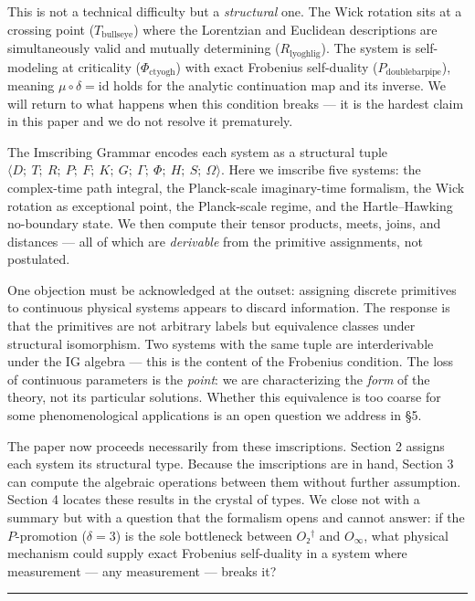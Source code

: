 \documentclass[12pt,a4paper]{article}
\newcommand{\pilcrow}{\S}
\begin{document}
This is not a technical difficulty but a \emph{structural} one. The Wick rotation sits at a crossing point ($T_{\text{bullseye}}$) where the Lorentzian and Euclidean descriptions are simultaneously valid and mutually determining ($R_{\text{lyoghlig}}$). The system is self-modeling at criticality ($\Phi_{\text{ctyogh}}$) with exact Frobenius self-duality ($P_{\text{doublebarpipe}}$), meaning $\mu \circ \delta = \text{id}$ holds for the analytic continuation map and its inverse. We will return to what happens when this condition breaks --- it is the hardest claim in this paper and we do not resolve it prematurely.

The Imscribing Grammar encodes each system as a structural tuple $\langle D;\ T;\ R;\ P;\ F;\ K;\ G;\ \Gamma;\ \Phi;\ H;\ S;\ \Omega \rangle$. Here we imscribe five systems: the complex-time path integral, the Planck-scale imaginary-time formalism, the Wick rotation as exceptional point, the Planck-scale regime, and the Hartle--Hawking no-boundary state. We then compute their tensor products, meets, joins, and distances --- all of which are \emph{derivable} from the primitive assignments, not postulated.

One objection must be acknowledged at the outset: assigning discrete primitives to continuous physical systems appears to discard information. The response is that the primitives are not arbitrary labels but equivalence classes under structural isomorphism. Two systems with the same tuple are interderivable under the IG algebra --- this is the content of the Frobenius condition. The loss of continuous parameters is the \emph{point}: we are characterizing the \emph{form} of the theory, not its particular solutions. Whether this equivalence is too coarse for some phenomenological applications is an open question we address in \pilcrow{}5.

The paper now proceeds necessarily from these imscriptions. Section 2 assigns each system its structural type. Because the imscriptions are in hand, Section 3 can compute the algebraic operations between them without further assumption. Section 4 locates these results in the crystal of types. We close not with a summary but with a question that the formalism opens and cannot answer: if the $P$-promotion ($\delta = 3$) is the sole bottleneck between $O₂^\dagger$ and $O_{\infty}$, what physical mechanism could supply exact Frobenius self-duality in a system where measurement --- any measurement --- breaks it?

\begin{center}
\rule{0.5\textwidth}{0.4pt}
\end{center}
\end{document}

